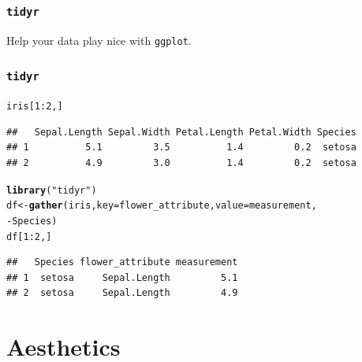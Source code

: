 \documentclass{beamer}\usepackage[]{graphicx}\usepackage[]{color}
\makeatletter
\newcommand{\hlnum}[1]{\textcolor[rgb]{0.686,0.059,0.569}{#1}}%
\newcommand{\hlstr}[1]{\textcolor[rgb]{0.192,0.494,0.8}{#1}}%
\newcommand{\hlopt}[1]{\textcolor[rgb]{0,0,0}{#1}}%
\newcommand{\hlstd}[1]{\textcolor[rgb]{0.345,0.345,0.345}{#1}}%
\newcommand{\hlkwb}[1]{\textcolor[rgb]{0.69,0.353,0.396}{#1}}%
\newcommand{\hlkwc}[1]{\textcolor[rgb]{0.333,0.667,0.333}{#1}}%
\newcommand{\hlkwd}[1]{\textcolor[rgb]{0.737,0.353,0.396}{\textbf{#1}}}%
\newenvironment{kframe}{%
 \def\at@end@of@kframe{}%
 \ifinner\ifhmode%
  \def\at@end@of@kframe{\end{minipage}}%
  \begin{minipage}{\columnwidth}%
 \fi\fi%
 \def\FrameCommand##1{\hskip\@totalleftmargin \hskip-\fboxsep
 \colorbox{shadecolor}{##1}\hskip-\fboxsep
     \hskip-\linewidth \hskip-\@totalleftmargin \hskip\columnwidth}%
 \MakeFramed {\advance\hsize-\width
   \@totalleftmargin\z@ \linewidth\hsize
   \@setminipage}}%
 {\par\unskip\endMakeFramed%
 \at@end@of@kframe}
\newenvironment{knitrout}{}{} %
\makeatother
\begin{document}


\begin{frame}[fragile]
\frametitle{\texttt{tidyr}}
Help your data play nice with \texttt{ggplot}.
\end{frame}


\begin{frame}[fragile]
\frametitle{\texttt{tidyr}}
\begin{knitrout}\footnotesize
{}\color{fgcolor}\begin{kframe}
\begin{alltt}
\hlstd{iris[}\hlnum{1}\hlopt{:}\hlnum{2}\hlstd{, ]}
\end{alltt}
\begin{verbatim}
##   Sepal.Length Sepal.Width Petal.Length Petal.Width Species
## 1          5.1         3.5          1.4         0.2  setosa
## 2          4.9         3.0          1.4         0.2  setosa
\end{verbatim}
\begin{alltt}
\hlkwd{library}\hlstd{(}\hlstr{"tidyr"}\hlstd{)}
\hlstd{df} \hlkwb{<-} \hlkwd{gather}\hlstd{(iris,} \hlkwc{key} \hlstd{= flower_attribute,} \hlkwc{value} \hlstd{= measurement,}
                         \hlopt{-}\hlstd{Species)}
\hlstd{df[}\hlnum{1}\hlopt{:}\hlnum{2}\hlstd{, ]}
\end{alltt}
\begin{verbatim}
##   Species flower_attribute measurement
## 1  setosa     Sepal.Length         5.1
## 2  setosa     Sepal.Length         4.9
\end{verbatim}
\end{kframe}
\end{knitrout}
\end{frame}


\section*{Aesthetics}
\frame{\sectionpage}

\end{document}
